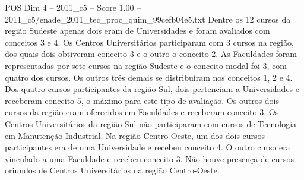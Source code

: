\begin{textsample}{POS Dim 4 – 2011\_c5 – Score 1.00 – 2011\_c5/enade\_2011\_tec\_proc\_quim\_99cefb04e5.txt}
Dentre os 12 cursos da região Sudeste apenas dois eram de Universidades e foram avaliados com conceitos 3 e 4.
Os Centros Universitários participaram com 3 cursos na região, dos quais dois obtiveram conceito 3 e o outro o conceito 2.
As Faculdades foram representadas por sete cursos na região Sudeste e o conceito modal foi 3, com quatro dos cursos.
Os outros três demais se distribuíram nos conceitos 1, 2 e 4.
Dos quatro cursos participantes da região Sul, dois pertenciam a Universidades e receberam conceito 5, o máximo para este tipo de avaliação.
Os outros dois cursos da região eram oferecidos em Faculdades e receberam conceito 3.
Os Centros Universitários da região Sul não participaram com cursos de Tecnologia em Manutenção Industrial.
Na região Centro-Oeste, um dos dois cursos participantes era de uma Universidade e recebeu conceito 4.
O outro curso era vinculado a uma Faculdade e recebeu conceito 3.
Não houve presença de cursos oriundos de Centros Universitários na região Centro-Oeste.

\end{textsample}
